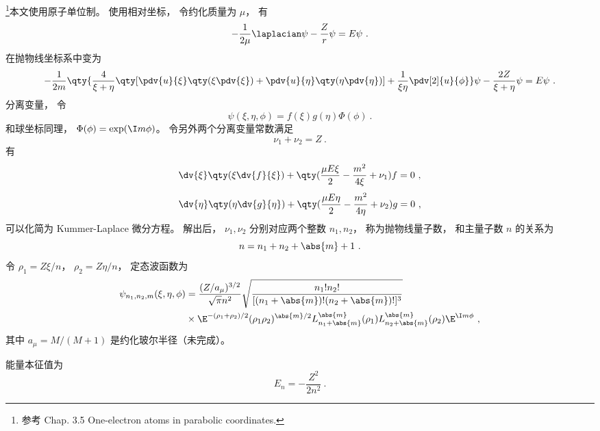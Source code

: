 
\begin{issues}
\issueDraft
{}
\end{issues}


\footnote{参考 \cite{Bransden} Chap. 3.5 One-electron atoms in parabolic coordinates.}本文使用原子单位制。 使用相对坐标， 令约化质量为 $\mu$， 有
\begin{equation}
-\frac{1}{2\mu} \laplacian \psi - \frac{Z}{r} \psi = E\psi~.
\end{equation}
在抛物线坐标系中变为
\begin{equation}
-\frac{1}{2m} \qty{\frac{4}{\xi + \eta} \qty[\pdv{u}{\xi}\qty(\xi\pdv{\xi}) + \pdv{u}{\eta}\qty(\eta\pdv{\eta})] + \frac{1}{\xi\eta}\pdv[2]{u}{\phi}}\psi - \frac{2Z}{\xi + \eta}\psi = E\psi~.
\end{equation}
分离变量， 令
\begin{equation}
\psi(\xi, \eta, \phi) = f(\xi) g(\eta) \Phi(\phi)~.
\end{equation}
和球坐标同理， $\Phi(\phi) = \exp(\I m \phi)$。 令另外两个分离变量常数满足
\begin{equation}
\nu_1 + \nu_2 = Z~.
\end{equation}
有
\begin{equation}\label{eq_ParaHy_1}
\dv{\xi} \qty(\xi \dv{f}{\xi}) + \qty(\frac{\mu E \xi}{2} - \frac{m^2}{4\xi} + \nu_1) f = 0~,
\end{equation}
\begin{equation}
\dv{\eta}\qty(\eta \dv{g}{\eta}) + \qty(\frac{\mu E\eta}{2} - \frac{m^2}{4\eta} + \nu_2)g = 0~,
\end{equation}
可以化简为 Kummer-Laplace 微分方程。 解出后， $\nu_1, \nu_2$ 分别对应两个整数 $n_1, n_2$， 称为抛物线量子数， 和主量子数 $n$ 的关系为
\begin{equation}
n = n_1 + n_2 + \abs{m} + 1~.
\end{equation}
令 $\rho_1 = Z\xi / n$， $\rho_2 = Z\eta/n$， 定态波函数为
\begin{equation}\label{eq_ParaHy_2}
\begin{aligned}
\psi_{n_1,n_2,m}(\xi,\eta,\phi) &= \frac{(Z/a_\mu)^{3/2}}{\sqrt{\pi} n^2} \sqrt{\frac{n_1!n_2!}{[(n_1+\abs{m})!(n_2+\abs{m})!]^3}} \\
&\times \E^{-(\rho_1+\rho_2)/2}(\rho_1\rho_2)^{\abs{m}/2} L_{n_1 + \abs{m}}^{\abs{m}}(\rho_1) L_{n_2 + \abs{m}}^{\abs{m}}(\rho_2) \E^{\I m\phi}~,
\end{aligned}
\end{equation}
其中 $a_\mu = M/(M + 1)$ 是约化玻尔半径（未完成）。

能量本征值为
\begin{equation}
E_n = -\frac{Z^2}{2n^2}~.
\end{equation}
